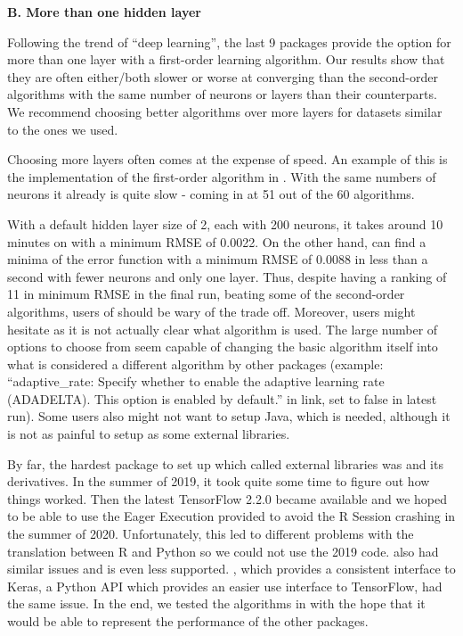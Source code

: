 \textbf{B. More than one hidden layer}

Following the trend of ``deep learning'', the last 9 packages provide
the option for more than one layer with a first-order learning
algorithm. Our results show that they are often either/both slower or
worse at converging than the second-order algorithms with the same
number of neurons or layers than their counterparts. We recommend
choosing better algorithms over more layers for datasets similar to the
ones we used.

Choosing more layers often comes at the expense of speed. An example of
this is the implementation of the first-order algorithm in 
\citep{R-h2o}. With the same numbers of neurons it already is quite slow
- coming in at 51 out of the 60 algorithms.

With a default hidden layer size of 2, each with 200 neurons, it takes
around 10 minutes on  with a minimum RMSE of 0.0022. On
the other hand,  can find a minima of the error function
with a minimum RMSE of 0.0088 in less than a second with fewer neurons
and only one layer. Thus, despite having a ranking of 11 in minimum RMSE
in the final run, beating some of the second-order algorithms, users of
 should be wary of the trade off. Moreover, users might
hesitate as it is not actually clear what algorithm is used. The large
number of options to choose from seem capable of changing the basic
algorithm itself into what is considered a different algorithm by other
packages (example: ``adaptive\_rate: Specify whether to enable the
adaptive learning rate (ADADELTA). This option is enabled by default.''
in link, set to false in latest run). Some users also might not want to
setup Java, which is needed, although it is not as painful to setup as
some external libraries.

By far, the hardest package to set up which called external libraries
was  \citep{R-tensorflow} and its derivatives. In
the summer of 2019, it took quite some time to figure out how things
worked. Then the latest \textsf{TensorFlow} 2.2.0 became available and
we hoped to be able to use the Eager Execution provided to avoid the
\textsf{R} Session crashing in the summer of 2020. Unfortunately, this
led to different problems with the translation between \textsf{R} and
\textsf{Python} so we could not use the 2019 code.
 \citep{R-tfestimators} also had similar issues
and is even less supported.  \citep{R-kerasR}, which
provides a consistent interface to Keras, a \textsf{Python} API which
provides an easier use interface to TensorFlow, had the same issue. In
the end, we tested the algorithms in  \citep{R-keras}
with the hope that it would be able to represent the performance of the
other packages.

